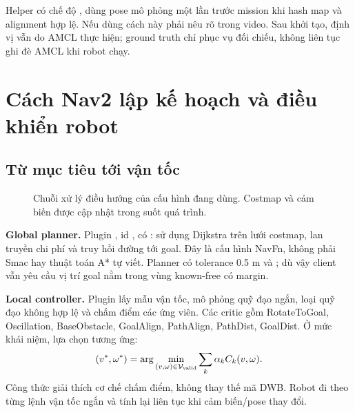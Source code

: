 Helper  có chế độ , dùng pose mô phỏng một lần trước mission khi hash map và alignment hợp lệ. Nếu dùng cách này phải nêu rõ trong video. Sau khởi tạo, định vị vẫn do AMCL thực hiện; ground truth chỉ phục vụ đối chiếu, không liên tục ghi đè AMCL khi robot chạy.
\clearpage

\section{Cách Nav2 lập kế hoạch và điều khiển robot}
\subsection{Từ mục tiêu tới vận tốc}
\begin{figure}[H]\centering
{}
\caption[Pipeline lập kế hoạch và điều khiển Nav2]{Chuỗi xử lý điều hướng của cấu hình đang dùng. Costmap và cảm biến được cập nhật trong suốt quá trình.}\label{fig:navflow}
\end{figure}
\textbf{Global planner.} Plugin , id , có : sử dụng Dijkstra trên lưới costmap, lan truyền chi phí và truy hồi đường tới goal. Đây là cấu hình NavFn, không phải Smac hay thuật toán A* tự viết. Planner có tolerance 0.5 m và ; dù vậy client vẫn yêu cầu vị trí goal nằm trong vùng known-free có margin.

\textbf{Local controller.} Plugin  lấy mẫu vận tốc, mô phỏng quỹ đạo ngắn, loại quỹ đạo không hợp lệ và chấm điểm các ứng viên. Các critic gồm RotateToGoal, Oscillation, BaseObstacle, GoalAlign, PathAlign, PathDist, GoalDist. Ở mức khái niệm, lựa chọn tương ứng:
\begin{equation}
(v^*,\omega^*)=\arg\min_{(v,\omega)\in\mathcal V_{\rm valid}}\sum_k\alpha_k C_k(v,\omega).
\end{equation}
Công thức giải thích cơ chế chấm điểm, không thay thế mã DWB. Robot đi theo từng lệnh vận tốc ngắn và tính lại liên tục khi cảm biến/pose thay đổi.
\clearpage

